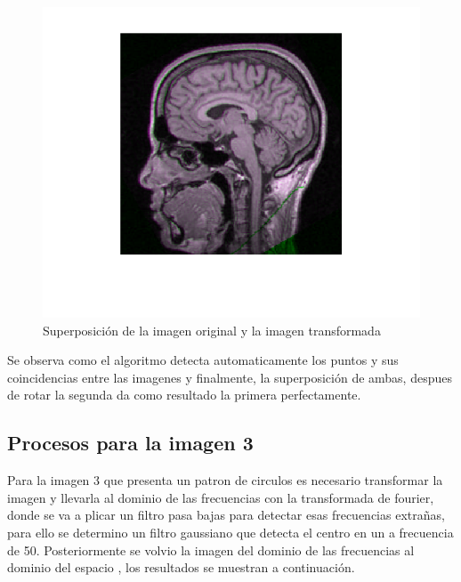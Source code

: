 \documentclass[11pt, letterpaper]{article}
\begin{document}
\begin{figure}[h!]
	\centering
	\begin{minipage}{0.7\textwidth}
		\centering
		\includegraphics[width=\textwidth]{R4.png}
		\caption{Superposición de la imagen original y la imagen transformada}
		\label{fig:f5}
	\end{minipage}\hfill
\end{figure}

Se observa como el algoritmo detecta automaticamente los puntos y sus coincidencias entre las imagenes y finalmente, la superposición de ambas, despues de rotar la segunda da como resultado la primera perfectamente.


\newpage
	
\subsection{Procesos para la imagen 3}

Para la imagen 3 que presenta un patron de circulos es necesario transformar la imagen y llevarla al dominio de las frecuencias con la transformada de fourier, donde se va a plicar un filtro pasa bajas para detectar esas frecuencias extrañas, para ello se determino un filtro gaussiano que detecta el centro en un a frecuencia de 50. Posteriormente se volvio la imagen del dominio de las frecuencias al dominio del espacio  , los resultados se muestran a continuación.
\end{document}
